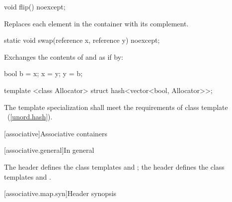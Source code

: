 %
%
\begin{itemdecl}
void flip() noexcept;
\end{itemdecl}

\begin{itemdescr}
\pnum
\effects Replaces each element in the container with its complement.
\end{itemdescr}

%
%
\begin{itemdecl}
static void swap(reference x, reference y) noexcept;
\end{itemdecl}

\begin{itemdescr}
\pnum
\effects Exchanges the contents of  and  as if by:

\begin{codeblock}
bool b = x;
x = y;
y = b;
\end{codeblock}

\end{itemdescr}

\begin{itemdecl}
template <class Allocator> struct hash<vector<bool, Allocator>>;
\end{itemdecl}

\begin{itemdescr}
\pnum
The template specialization shall meet the requirements of class template
~(\ref{unord.hash}).
\end{itemdescr}

[associative]{Associative containers}

[associative.general]{In general}

\pnum
The header  defines the class templates  and
; the header  defines the class templates
 and .

[associative.map.syn]{Header  synopsis}

